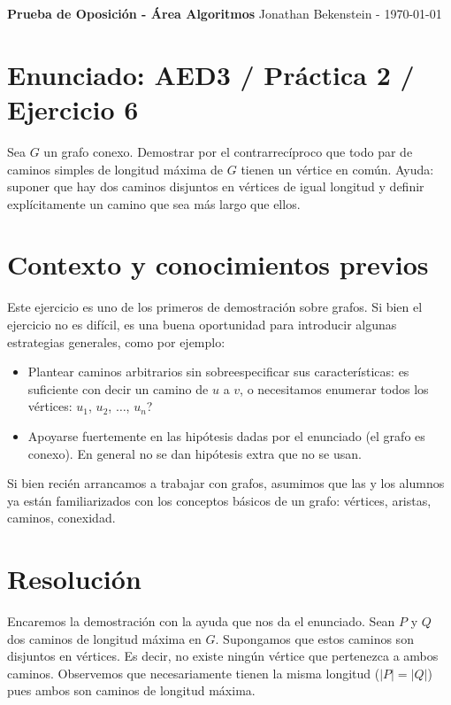 

\pagesetup{12pt}




\textbf{Prueba de Oposición - Área Algoritmos}
\hfill
Jonathan Bekenstein - \today

\section*{Enunciado: AED3 / Práctica 2 / Ejercicio 6}

Sea $G$ un grafo conexo. Demostrar por el contrarrecíproco que todo par de caminos simples de longitud máxima de $G$ tienen un vértice en común. Ayuda: suponer que hay dos caminos disjuntos en vértices de igual longitud y definir explícitamente un camino que sea más largo que ellos.

\section*{Contexto y conocimientos previos}

Este ejercicio es uno de los primeros de demostración sobre grafos. Si bien el ejercicio no es difícil, es una buena oportunidad para introducir algunas estrategias generales, como por ejemplo:

\begin{itemize}
    \item Plantear caminos arbitrarios sin sobreespecificar sus características: es suficiente con decir un camino de $u$ a $v$, o necesitamos enumerar todos los vértices: $u_1$, $u_2$, $\dots$, $u_n$?
    \item Apoyarse fuertemente en las hipótesis dadas por el enunciado (el grafo es conexo). En general no se dan hipótesis extra que no se usan.
\end{itemize}

Si bien recién arrancamos a trabajar con grafos, asumimos que las y los alumnos ya están familiarizados con los conceptos básicos de un grafo: vértices, aristas, caminos, conexidad.

\section*{Resolución}

Encaremos la demostración con la ayuda que nos da el enunciado. Sean $P$ y $Q$ dos caminos de longitud máxima en $G$. Supongamos que estos caminos son disjuntos en vértices. Es decir, no existe ningún vértice que pertenezca a ambos caminos. Observemos que necesariamente tienen la misma longitud ($|P| = |Q|$) pues ambos son caminos de longitud máxima.

